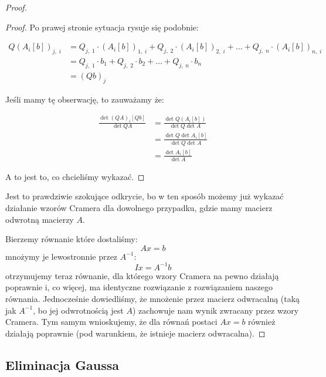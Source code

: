 \begin{proof}
\begin{proof}
Po prawej stronie sytuacja rysuje się podobnie:

\begin{align*}
    Q(A_i[b])_{j, \; i} &= Q_{j, \; 1} \cdot (A_i[b])_{1, \; i} + Q_{j, \; 2} \cdot (A_i[b])_{2, \; i} + \dots + Q_{j, \; n} \cdot (A_i[b])_{n, \; i} \\ &=  
     Q_{j, \; 1} \cdot b_1 + Q_{j, \; 2} \cdot b_2 + \dots + Q_{j, \; n} \cdot b_n \\ 
     &= (Qb)_{j}
\end{align*}

Jeśli mamy tę obserwację, to zauważamy że:

\begin{align*}
    \frac{\det{(QA)_i[Qb]}}{\det{QA}} &= \frac{\det{Q(A_i[b])}}{\det{Q}\det{A}} \\ 
    &= \frac{\det{Q} \det{A_i[b]}}{\det{Q}\det{A}} \\ 
    &= \frac{\det{A_i[b]}}{\det{A}} 
\end{align*}

A to jest to, co chcieliśmy wykazać. 
\end{proof}

Jest to prawdziwie szokujące odkrycie, bo w ten sposób możemy już wykazać działanie wzorów Cramera dla dowolnego przypadku, gdzie mamy macierz odwrotną macierzy \(A\).

Bierzemy równanie które dostaliśmy:
\[
Ax = b
\]
mnożymy je lewostronnie przez \(A^{-1}\):
\[
Ix = A^{-1}b
\]
otrzymujemy teraz równanie, dla którego wzory Cramera na pewno działają poprawnie i, co więcej, ma identyczne rozwiązanie z rozwiązaniem naszego równania. Jednocześnie dowiedliśmy, że mnożenie przez macierz odwracalną (taką jak \(A^{-1}\), bo jej odwrotnością jest \(A\)) zachowuje nam wynik zwracany przez wzory Cramera. Tym samym wnioskujemy, że dla równań postaci \(Ax = b\) również działają poprawnie (pod warunkiem, że istnieje macierz odwracalna). 

\end{proof}

\subsection{Eliminacja Gaussa}